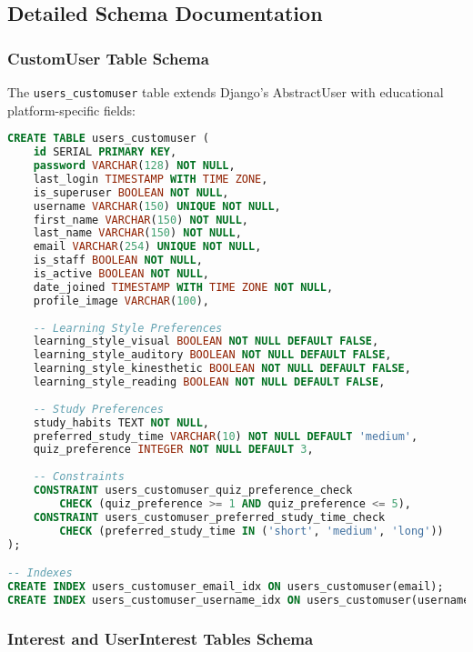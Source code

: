 \documentclass[12pt,a4paper]{article}
\begin{document}
\subsection{Detailed Schema Documentation}

\subsubsection{CustomUser Table Schema}

The \texttt{users\_customuser} table extends Django's AbstractUser with educational platform-specific fields:

\begin{lstlisting}[language=SQL, caption=CustomUser Table Structure]
CREATE TABLE users_customuser (
    id SERIAL PRIMARY KEY,
    password VARCHAR(128) NOT NULL,
    last_login TIMESTAMP WITH TIME ZONE,
    is_superuser BOOLEAN NOT NULL,
    username VARCHAR(150) UNIQUE NOT NULL,
    first_name VARCHAR(150) NOT NULL,
    last_name VARCHAR(150) NOT NULL,
    email VARCHAR(254) UNIQUE NOT NULL,
    is_staff BOOLEAN NOT NULL,
    is_active BOOLEAN NOT NULL,
    date_joined TIMESTAMP WITH TIME ZONE NOT NULL,
    profile_image VARCHAR(100),
    
    -- Learning Style Preferences
    learning_style_visual BOOLEAN NOT NULL DEFAULT FALSE,
    learning_style_auditory BOOLEAN NOT NULL DEFAULT FALSE,
    learning_style_kinesthetic BOOLEAN NOT NULL DEFAULT FALSE,
    learning_style_reading BOOLEAN NOT NULL DEFAULT FALSE,
    
    -- Study Preferences
    study_habits TEXT NOT NULL,
    preferred_study_time VARCHAR(10) NOT NULL DEFAULT 'medium',
    quiz_preference INTEGER NOT NULL DEFAULT 3,
    
    -- Constraints
    CONSTRAINT users_customuser_quiz_preference_check 
        CHECK (quiz_preference >= 1 AND quiz_preference <= 5),
    CONSTRAINT users_customuser_preferred_study_time_check 
        CHECK (preferred_study_time IN ('short', 'medium', 'long'))
);

-- Indexes
CREATE INDEX users_customuser_email_idx ON users_customuser(email);
CREATE INDEX users_customuser_username_idx ON users_customuser(username);
\end{lstlisting}

\subsubsection{Interest and UserInterest Tables Schema}
\end{document}
